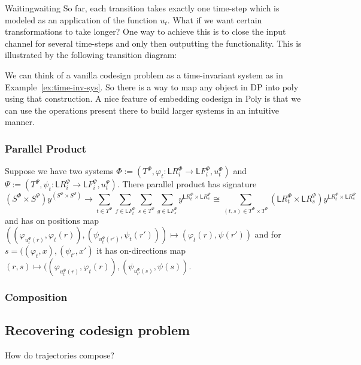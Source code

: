 \documentclass[12pt, a4paper]{article}
\theoremstyle{definition}
\theoremstyle{plain}
\theoremstyle{plain}
\theoremstyle{plain}
\theoremstyle{plain}
\theoremstyle{plain}
\theoremstyle{remark}
\theoremstyle{remark}
\newcommand{\low}{\mathsf{L}}
\begin{document}
\begin{tcexample}{Waiting}{waiting}
    So far, each transition takes exactly one time-step which is modeled as an application of the function $u_t$. What if we want certain transformations to take longer? One way to achieve this is to close the input channel for several time-steps and only then outputting the functionality. This is illustrated by the following transition diagram:

\end{tcexample}

We can think of a vanilla codesign problem as a time-invariant system as in Example~\ref{ex:time-inv-sys}. So there is a way to map any object in \textsf{DP} into poly using that construction. A nice feature of embedding codesign in \textsf{Poly} is that we can use the operations present there to build larger systems in an intuitive manner.

\subsubsection{Parallel Product}
Suppose we have two systems $\Phi := (T^\Phi, \varphi_t :\low R^\Phi_i \rightarrow \low F^\Phi_i, u^\Phi_t) $ and $\Psi := (T^\Psi, \psi_t :\low R^\Psi_i \rightarrow \low F^\Psi_i, u^\Psi_t) $. There parallel product has signature
$$(S^\Phi \times S^\Psi) y^{(S^\Phi \times S^\Psi)} \rightarrow \sum_{t \in T^\Phi}\sum_{f \in \low F^\Phi_t} \sum_{s \in T^\Psi} \sum_{g \in \low F^\Psi_s} y^{\low R^\Phi_t \times \low R^\Psi_s} \cong \sum_{(t,s) \in T^\Phi \times T^\Psi} (\low R^\Phi_t \times \low R^\Psi_s) y^{\low R^\Phi_t \times \low R^\Psi_s}  $$
and has on positions map $((\varphi_{u^\Phi_t(r)}, \varphi_t(r)),(\psi_{u^\Psi_t(r')}, \psi_t(r'))) \mapsto (\varphi_t(r), \psi(r'))$ and for $s = ((\varphi_t, x),(\psi_{t'}, x')$ it has on-directions map $(r,s) \mapsto ((\varphi_{u^\Phi_t(r)}, \varphi_t(r)),(\psi_{u^\Psi_{t'}(s)}, \psi(s))$.

\subsubsection{Composition}


\subsection{Recovering codesign problem}

How do trajectories compose?
\end{document}
